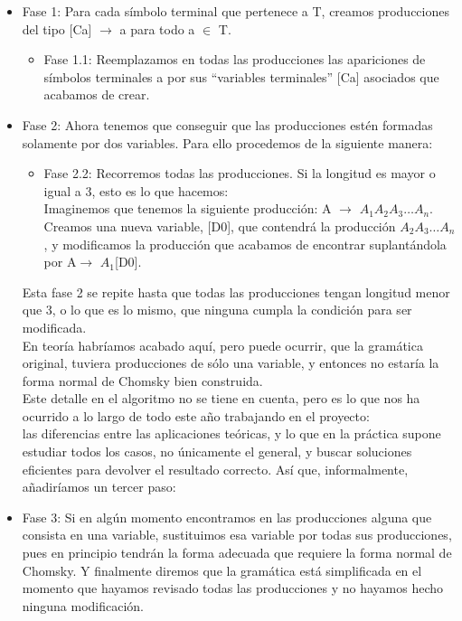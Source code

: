 \documentclass[12pt,a4paper,spanish]{book}
\begin{document}
\begin{itemize}
\item Fase 1: Para cada s\'imbolo terminal que pertenece a T, creamos producciones del tipo [Ca] $\rightarrow$ a
para todo a $\in$ T.
\begin{itemize}
\item Fase 1.1: Reemplazamos en todas las producciones las apariciones de s\'imbolos terminales  a por sus ``variables terminales'' [Ca] asociados que acabamos de crear.
\end{itemize}
\item Fase 2: Ahora tenemos que conseguir que las producciones est\'en formadas solamente por dos variables. Para ello procedemos de la siguiente manera:
\begin{itemize}
\item Fase 2.2: Recorremos todas las producciones. Si la longitud es mayor o igual a 3, esto es lo que hacemos:\\
Imaginemos que tenemos la siguiente producci\'on: A $\rightarrow$ $A_{1}A_{2}A_{3} \ldots A_{n}$. Creamos una nueva variable, [D0], que contendr\'a la producci\'on $A_{2}A_{3} \ldots A_{n}$, y modificamos la producci\'on que acabamos de encontrar suplant\'andola por A$\rightarrow$ $A_{1}$[D0].
\end{itemize}
	Esta fase 2 se repite hasta que todas las producciones tengan longitud menor que 3, o lo que es lo mismo, que ninguna cumpla la condici\'on para ser modificada.\\
\newline
En teor\'ia habr\'iamos acabado aqu\'i, pero puede ocurrir, que la gram\'atica original, tuviera producciones de s\'olo una variable, y entonces no estar\'ia la forma normal de Chomsky bien construida.\\ Este detalle en el algoritmo no se tiene en cuenta, pero es lo que nos ha ocurrido a lo largo de todo este a\~no trabajando en el proyecto:\\ las diferencias entre las aplicaciones te\'oricas, y lo que en la pr\'actica supone estudiar todos los casos, no \'unicamente el general, y buscar soluciones eficientes para devolver el resultado correcto. As\'i que, informalmente, a\~nadir\'iamos un tercer paso:
\item Fase 3: Si en alg\'un momento encontramos en las producciones alguna que consista en una variable, sustituimos esa variable por todas sus producciones, pues en principio tendr\'an la forma adecuada que requiere la forma normal de Chomsky. Y finalmente diremos que la gram\'atica est\'a simplificada en el momento que hayamos revisado todas las producciones y no hayamos hecho ninguna modificaci\'on.
\end{itemize}
\end{document}
